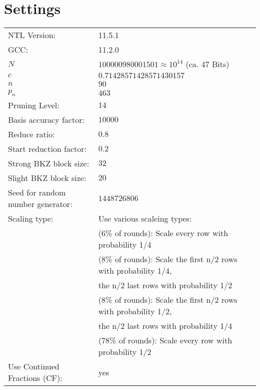 \documentclass[a4paper,twoside,10pt]{report}
\begin{document}
\onehalfspacing

\section*{Settings}
\begin{tabular}{ll}
NTL Version: & 11.5.1\\GCC: &11.2.0\\
$N$ & $100000980001501\approx 10^{14}$ (ca. 47 Bits)\\$c$ & $0.71428571428571430157$\\
$n$ & $ 90$\\
$p_n$ & $ 463$\\
Pruning Level: & $14$\\
Basis accuracy factor: & $10000$\\
Reduce ratio: & $0.8$\\
Start reduction factor: & $0.2$\\
Strong BKZ block size: & $32$\\
Slight BKZ block size: & $20$\\
Seed for random number generator: & $1448726806$\\
Scaling type: & Use various scaleing types:\\& (\phantom{7}6\% of rounds): Scale every row with probability 1/4\\& (\phantom{7}8\% of rounds): Scale the first n/2 rows with probability 1/4,\\& \phantom{(76\% of rounds): } the n/2 last rows with probability 1/2\\& (\phantom{7}8\% of rounds): Scale the first n/2 rows with probability 1/2,\\& \phantom{(76\% of rounds): } the n/2 last rows with probability 1/4\\& (78\% of rounds): Scale every row with probability 1/2\\
Use Continued Fractions (CF): & yes\\
\end{tabular}\\
\end{document}
